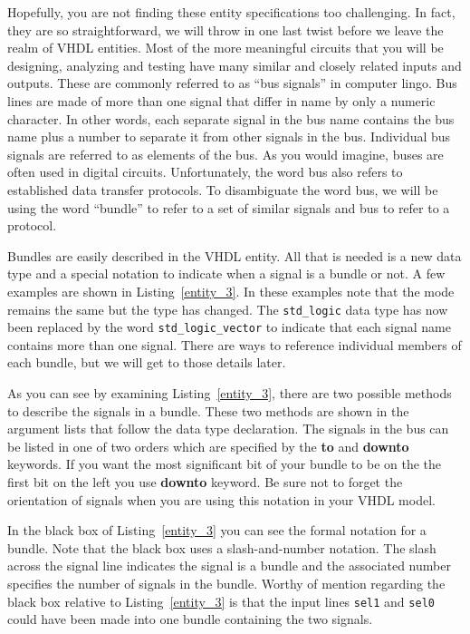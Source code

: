 Hopefully, you are not finding these entity specifications too challenging. In fact, they are so straightforward, we will throw in one last twist before we leave the realm of VHDL entities. Most of the more meaningful circuits that you will be designing, analyzing and testing have many similar and closely related inputs and outputs. These are commonly referred to as ``bus signals'' in computer lingo. Bus lines are made of more than one signal that differ in name by only a numeric character. In other words, each separate signal in the bus name contains the bus name plus a number to separate it from other signals in the bus. Individual bus signals are referred to as elements of the bus. As you would imagine, buses are often used in digital circuits. Unfortunately, the word bus also refers to established data transfer protocols. To disambiguate the word bus, we will be using the word ``bundle'' to refer to a set of similar signals and bus to refer to a protocol.

Bundles are easily described in the VHDL entity. All that is needed is a new data type and a special notation to indicate when a signal is a bundle or not. A few examples are shown in Listing~\ref{entity_3}. In these examples note that the mode remains the same but the type has changed. The \texttt{std\_logic} data type has now been replaced by the word \texttt{std\_logic\_vector} to indicate that each signal name contains more than one signal. There are ways to reference individual members of each bundle, but we will get to those details later.

As you can see by examining Listing~\ref{entity_3}, there are two possible methods to describe the signals in a bundle. These two methods are shown in the argument lists that follow the data type declaration. The signals in the bus can be listed in one of two orders which are specified by the \textbf{to} and \textbf{downto} keywords. If you want the most significant bit of your bundle to be on the the first bit on the left you use \textbf{downto} keyword. Be sure not to forget the orientation of signals when you are using this notation in your VHDL model.

In the black box of Listing~\ref{entity_3} you can see the formal notation for a bundle. Note that the black box uses a slash-and-number notation. The slash across the signal line indicates the signal is a bundle and the associated number specifies the number of signals in the bundle. Worthy of mention regarding the black box relative to Listing~\ref{entity_3} is that the input lines \texttt{sel1} and \texttt{sel0} could have been made into one bundle containing the two signals.

